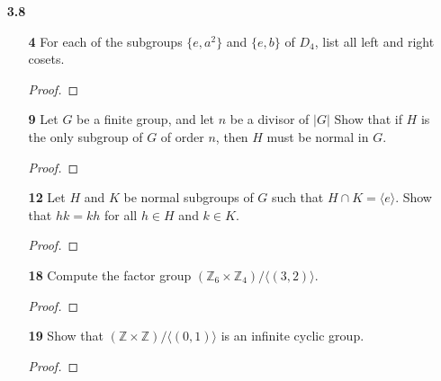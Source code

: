 \documentclass[paper=usletter, fontsize=12pt]{article}
\begin{document}
\begin{itemize}
\begin{enumerate}
\begin{proof}
            \end{proof}

            \item[\textbf{18}] Let the dihedral group $D_n$ be given by
            elements $a$ of order $n$ and $b$ of order 2, where $ba=a^{-1}b$.
            Show that any subgroup of $\langle a\rangle$ is normal in $D_n$.
            \begin{proof}
            \end{proof}

        \end{enumerate}

        \item[\textbf{3.8}]
        \begin{enumerate}

            \item[\textbf{4}] For each of the subgroups $\{e, a^2\}$ and
            $\{e,b\}$ of $D_4$, list all left and right cosets.
            \begin{proof}
            \end{proof}

            \item[\textbf{9}] Let $G$ be a finite group, and let $n$ be a
            divisor of $|G|$ Show that if $H$ is the only subgroup of $G$ of
            order $n$, then $H$ must be normal in $G$.
            \begin{proof}
            \end{proof}

            \item[\textbf{12}] Let $H$ and $K$ be normal subgroups of $G$ such
            that $H \cap K=\langle e \rangle$. Show that $hk=kh$ for all $h \in
            H$ and $k \in K$.
            \begin{proof}
            \end{proof}

            \item[\textbf{18}] Compute the factor group $(\mathbb{Z}_6 \times
            \mathbb{Z}_4)/ \langle(3,2)\rangle$.
            \begin{proof}
            \end{proof}

            \item[\textbf{19}] Show that $(\mathbb{Z} \times \mathbb{Z})/
            \langle(0,1)\rangle$ is an infinite cyclic group.
            \begin{proof}
            \end{proof}


\end{enumerate}
\end{itemize}
\end{document}

